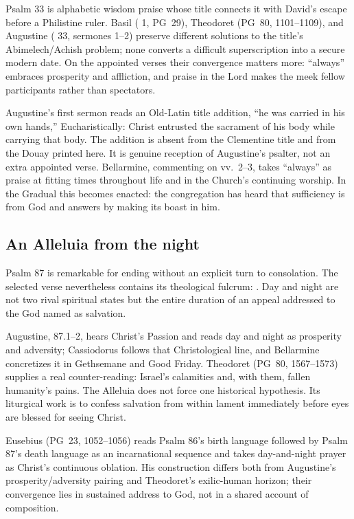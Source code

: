 Psalm 33 is alphabetic wisdom praise whose title connects it with David's
escape before a Philistine ruler. Basil ( 1,
PG~29), Theodoret (PG~80, 1101--1109), and Augustine ( 33, sermones 1--2) preserve different solutions to the title's
Abimelech/Achish problem; none converts a difficult superscription into a
secure modern date. On the appointed verses their convergence matters more:
``always'' embraces prosperity and affliction, and praise in the Lord makes
the meek fellow participants rather than spectators.

Augustine's first sermon reads an Old-Latin title addition, ``he was carried in
his own hands,'' Eucharistically: Christ entrusted the sacrament of his body
while carrying that body. The addition is absent from the Clementine title and
from the Douay printed here. It is genuine reception of Augustine's psalter,
not an extra appointed verse. Bellarmine, commenting on vv.~2--3, takes
``always'' as praise at fitting times throughout life and in the Church's
continuing worship. In the Gradual this becomes enacted: the congregation has
heard that sufficiency is from God and answers by making its boast in him.

\elementguard
\subsection*{An Alleluia from the night }

Psalm 87 is remarkable for ending without an explicit turn to consolation.
The selected verse nevertheless contains its theological fulcrum:
. Day and night are not two rival spiritual states but
the entire duration of an appeal addressed to the God named as salvation.

Augustine,  87.1--2, hears Christ's Passion and
reads day and night as prosperity and adversity; Cassiodorus follows that
Christological line, and Bellarmine concretizes it in Gethsemane and Good
Friday. Theodoret (PG~80, 1567--1573) supplies a real counter-reading: Israel's
calamities and, with them, fallen humanity's pains. The Alleluia does not force
one historical hypothesis. Its liturgical work is to confess salvation from
within lament immediately before eyes are blessed for seeing Christ.

Eusebius (PG~23, 1052--1056) reads Psalm 86's birth language followed by
Psalm 87's death language as an incarnational sequence and takes day-and-night
prayer as Christ's continuous oblation. His construction differs both from
Augustine's prosperity/adversity pairing and Theodoret's exilic-human horizon;
their convergence lies in sustained address to God, not in a shared account
of composition.

